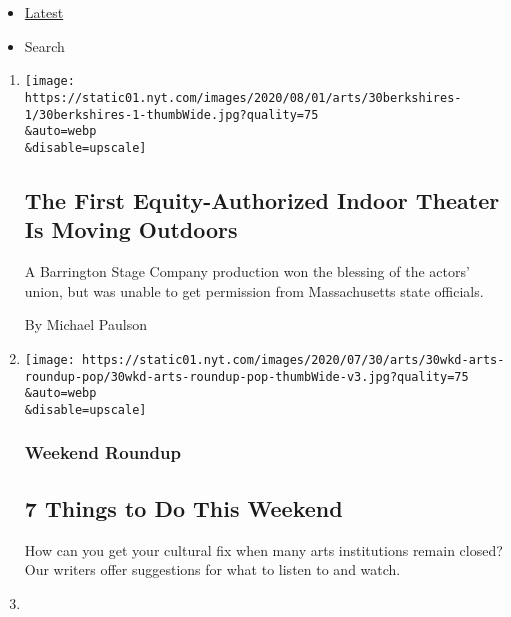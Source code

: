 \begin{itemize}
\tightlist
\item
  \protect\hyperlink{stream-panel}{Latest}
\item
  Search
\end{itemize}

\begin{enumerate}
\def\labelenumi{\arabic{enumi}.}
\item
  \href{/2020/07/30/theater/the-first-equity-authorized-indoor-theater-is-moving-outdoors.html}{}

  \texttt{[image: https://static01.nyt.com/images/2020/08/01/arts/30berkshires-1/30berkshires-1-thumbWide.jpg?quality=75\\\&auto=webp\\\&disable=upscale]}

  \hypertarget{the-first-equity-authorized-indoor-theater-is-moving-outdoors}{%
  \subsection{The First Equity-Authorized Indoor Theater Is Moving
  Outdoors}\label{the-first-equity-authorized-indoor-theater-is-moving-outdoors}}

  A Barrington Stage Company production won the blessing of the actors'
  union, but was unable to get permission from Massachusetts state
  officials.

  By Michael Paulson
\item
  \href{/2020/07/30/arts/things-to-do-weekend-coronavirus.html}{}

  \texttt{[image: https://static01.nyt.com/images/2020/07/30/arts/30wkd-arts-roundup-pop/30wkd-arts-roundup-pop-thumbWide-v3.jpg?quality=75\\\&auto=webp\\\&disable=upscale]}

  \hypertarget{weekend-roundup}{%
  \subsubsection{Weekend Roundup}\label{weekend-roundup}}

  \hypertarget{7-things-to-do-this-weekend}{%
  \subsection{7 Things to Do This
  Weekend}\label{7-things-to-do-this-weekend}}

  How can you get your cultural fix when many arts institutions remain
  closed? Our writers offer suggestions for what to listen to and watch.
\item
  \href{/2020/07/28/arts/alan-menken-egot.html}{}


\end{enumerate}
